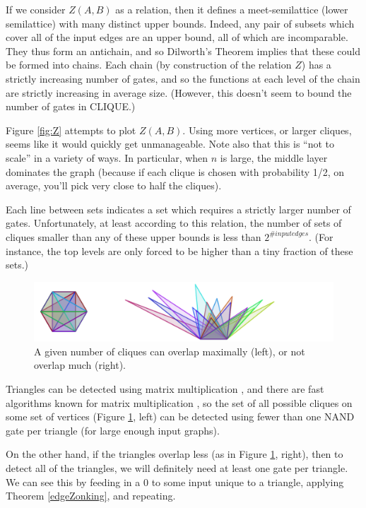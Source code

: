 \documentclass[12pt]{article}
\theoremstyle{definition}
\begin{document}
If we consider $Z(A, B)$ as a relation, then it defines a meet-semilattice
(lower semilattice) with 
many distinct upper bounds.  Indeed, any pair of subsets which
cover all of the input edges are an upper bound, all of which
are incomparable. They thus form an antichain, and so Dilworth's Theorem
implies that these could be formed into chains. Each chain (by construction
of the relation $Z$) has a strictly increasing number of gates, and so the
functions at each level of the chain are strictly increasing in average
size. (However, this doesn't seem to bound the number of gates in CLIQUE.)


Figure \ref{fig:Z} attempts to plot $Z(A,B)$. Using more vertices, or
larger cliques, seems like it would quickly get unmanageable.
Note also that this is ``not to scale'' in a variety of ways. In
particular, when $n$ is large, the middle layer dominates the graph
(because if each clique is chosen with probability 1/2, on average,
you'll pick very close to half the cliques).

Each line between sets indicates a set which requires a strictly larger number
of gates.
Unfortunately, at least according to this relation,
the number of sets of cliques smaller than
any of these upper bounds is less than $2^{\# input edges}$.
(For instance, the top levels are only forced to be higher than
a tiny fraction of these sets.)

\begin{figure}
\centering
\includegraphics[width=1\textwidth]{R/tri1.pdf}
\caption{A given number of cliques can overlap maximally (left),
or not overlap much (right).}
\label{fig:overlappingTriangles}
\end{figure}

Triangles can be detected using matrix multiplication \cite{itai_finding_1977},
and there are fast algorithms known for matrix multiplication
\cite{strassen_gaussian_1969}
\cite{williams_multiplying_2012}, so the set of all possible
cliques on some set of vertices (Figure \ref{fig:overlappingTriangles}, left)
 can be detected
using fewer than one NAND gate per triangle (for large enough input graphs).

On the other hand, if the triangles overlap less (as in
Figure \ref{fig:overlappingTriangles}, right),
then to detect all of the triangles, we will definitely need at least one
gate per triangle. We can see this by feeding in a 0 to some input
unique to a triangle, applying Theorem \ref{edgeZonking}, and repeating.
\end{document}
